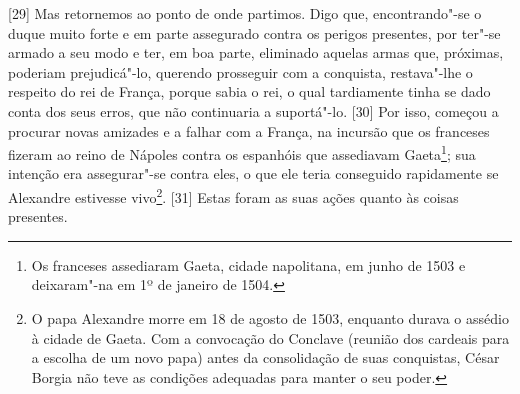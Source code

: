 {[}29{]} Mas retornemos ao ponto de onde partimos. Digo que,
encontrando"-se o duque muito forte e em parte assegurado contra os
perigos presentes, por ter"-se armado a seu modo e ter, em boa parte,
eliminado aquelas armas que, próximas, poderiam prejudicá"-lo, querendo
prosseguir com a conquista, restava"-lhe o respeito do rei de França,
porque sabia o rei, o qual tardiamente tinha se dado conta dos seus
erros, que não continuaria a suportá"-lo. {[}30{]} Por isso, começou a
procurar novas amizades e a falhar com a França, na incursão que os
franceses fizeram ao reino de Nápoles contra os espanhóis que assediavam
Gaeta\footnote{Os franceses assediaram Gaeta, cidade napolitana, em
  junho de 1503 e deixaram"-na em 1º de janeiro de 1504.}; sua intenção
era assegurar"-se contra eles, o que ele teria conseguido rapidamente se
Alexandre estivesse vivo\footnote{O papa Alexandre  morre em 18 de
  agosto de 1503, enquanto durava o assédio à cidade de Gaeta. Com a
  convocação do Conclave (reunião dos cardeais para a escolha de um novo
  papa) antes da consolidação de suas conquistas, César Borgia não teve
  as condições adequadas para manter o seu poder.}. {[}31{]} Estas foram
as suas ações quanto às coisas presentes.

